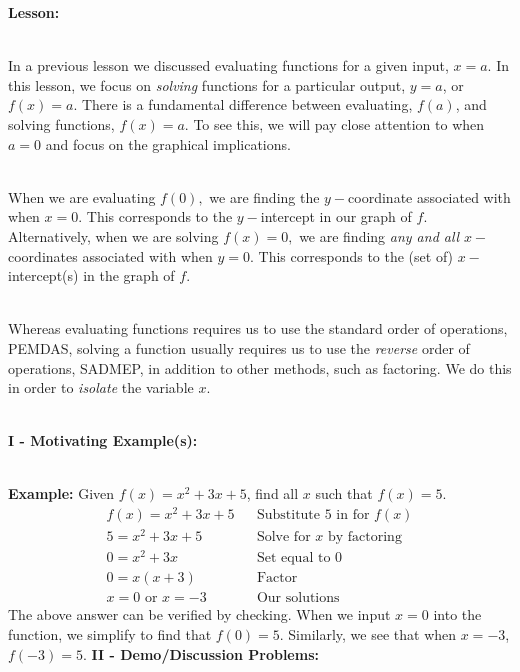 \documentclass[12pt]{article}
\theoremstyle{definition}
\begin{document}
{\bf Lesson:}\\
\ \par
In a previous lesson we discussed evaluating functions for a given input, $x=a$.  In this lesson, we focus on {\it solving} functions for a particular output, $y=a$, or $f(x)=a$.  There is a fundamental difference between evaluating, $f(a)$, and solving functions, $f(x)=a$.  To see this, we will pay close attention to when $a=0$ and focus on the graphical implications.\\
\ \par 
When we are evaluating $f(0),$ we are finding the $y-$coordinate associated with when $x=0$.  This corresponds to the $y-$intercept in our graph of $f$.  Alternatively, when we are solving $f(x)=0,$ we are finding {\it any and all} $x-$coordinates associated with when $y=0$.  This corresponds to the (set of) $x-$intercept(s) in the graph of $f$.\\
\ \par
Whereas evaluating functions requires us to use the standard order of operations, PEMDAS, solving a function usually requires us to use the {\it reverse} order of operations, SADMEP, in addition to other methods, such as factoring.  We do this in order to {\it isolate} the variable $x$.\\
\ \par 
{\bf I - Motivating Example(s):}\\
\ \par
{\bf Example:} Given $f(x)=x^2+3x+5$, find all $x$ such that $f(x)=5$.
  \begin{eqnarray*}
			f (x) = x^2+3x+5 & & \text{Substitute 5 in for } f(x)\\
			5 = x^2+3x+5  &  & \text{Solve for } x \text{ by factoring}\\
			0 = x^2+3x  &  & \text{Set equal to 0}\\
			0 = x(x+3)  &  & \text{Factor}\\
			x=0 \text{ or } x= -3  & & \text{Our solutions}
\end{eqnarray*}
The above answer can be verified by checking.  When we input $x=0$ into the function, we simplify to find that $f(0)=5$.  Similarly, we see that when $x=-3$, $f(-3)=5$.
\newpage
{\bf II - Demo/Discussion Problems:}%
\end{document}

